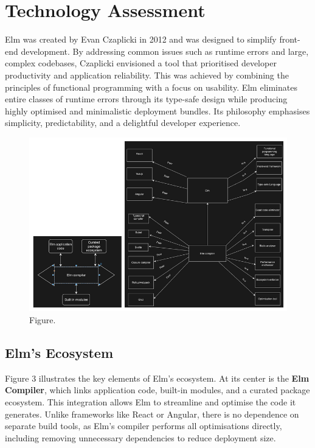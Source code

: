 \section{Technology Assessment}
\label{sec:technology}

Elm was created by Evan Czaplicki in 2012 and was designed to simplify front-end development. By addressing common issues such as runtime errors and large, complex codebases, Czaplicki envisioned a tool that prioritised developer productivity and application reliability. This was achieved by combining the principles of functional programming with a focus on usability. Elm eliminates entire classes of runtime errors through its type-safe design while producing highly optimised and minimalistic deployment bundles. Its philosophy emphasises simplicity, predictability, and a delightful developer experience.

\begin{figure}[thb]
	\centering
	\includegraphics[scale=0.5]{figs/diagram.png}
	\caption{Figure.}
	\label{fig:diagram}
\end{figure}

\subsection{Elm's Ecosystem}
Figure 3 illustrates the key elements of Elm’s ecosystem. At its center is the \textbf{Elm Compiler}, which links application code, built-in modules, and a curated package ecosystem. This integration allows Elm to streamline and optimise the code it generates. Unlike frameworks like React or Angular, there is no dependence on separate build tools, as Elm’s compiler performs all optimisations directly, including removing unnecessary dependencies to reduce deployment size.

